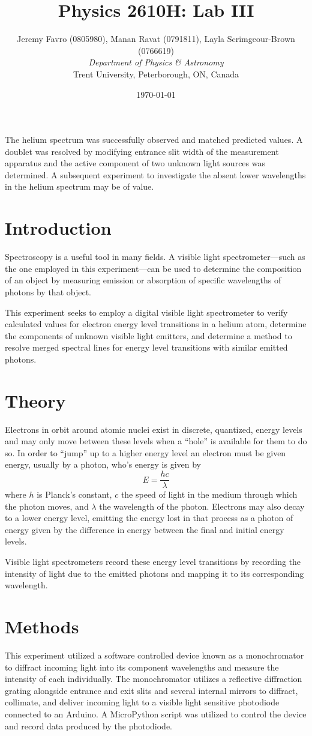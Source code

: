 \documentclass[10pt, twocolumn]{article}
\title{Physics 2610H: Lab III}
\author{Jeremy Favro (0805980),
Manan Ravat (0791811),
Layla Scrimgeour-Brown (0766619)
 \\\emph{Department of Physics \& Astronomy}\\ Trent University, Peterborough, ON, Canada}
\date{\today}
\theoremstyle{definition}
\begin{document}
\maketitle
\begin{abstract}
\end{abstract}
The helium spectrum was successfully observed and matched predicted values. A doublet was resolved by modifying entrance slit width of the
measurement apparatus and the active component of two unknown light sources was determined. A subsequent experiment to investigate the
absent lower wavelengths in the helium spectrum may be of value.
\section{Introduction}
Spectroscopy is a useful tool in many fields. A visible light spectrometer---such as the one employed in this experiment---can be used to determine the composition of an object by measuring emission or absorption of
specific wavelengths of photons by that object.

This experiment seeks to employ a digital visible light spectrometer to verify calculated values for electron energy level transitions in a helium atom,
determine the components of unknown visible light emitters, and determine a method to resolve merged spectral lines for energy
level transitions with similar emitted photons.
\section{Theory}
Electrons in orbit around atomic nuclei exist in discrete, quantized, energy levels and may only move between these levels when a ``hole''
is available for them to do so. In order to ``jump'' up to a higher energy level an electron must be given energy, usually by a photon, who's energy is given by
$$E=\frac{hc}{\lambda}$$ where $h$ is Planck's constant\autocite{codata}, $c$ the speed of light in the medium through which the photon moves, and $\lambda$ the
wavelength of the photon. Electrons may also decay to a lower energy level, emitting the energy lost in that process as a photon of energy given by the difference in energy
between the final and initial energy levels.

Visible light spectrometers record these energy level transitions by recording the intensity of light due to the emitted photons
and mapping it to its corresponding wavelength.
\vfill\null
\section{Methods}
This experiment utilized a software controlled device known as a monochromator to diffract incoming light into its component wavelengths
and measure the intensity of each individually. The monochromator utilizes a reflective diffraction grating alongside entrance and exit slits
and several internal mirrors to diffract, collimate, and deliver incoming light to a visible light sensitive photodiode connected to an Arduino.
A MicroPython script was utilized to control the device and record data produced by the photodiode.
\end{document}
